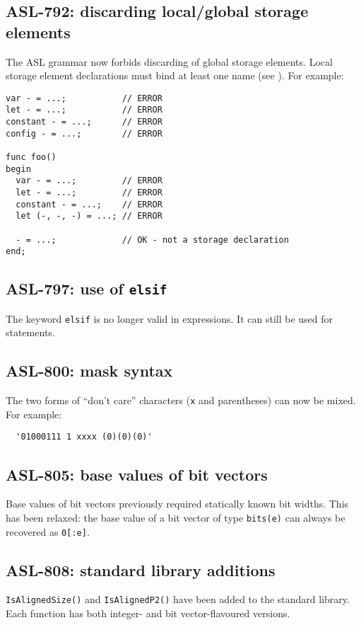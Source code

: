 \subsection{ASL-792: discarding local/global storage elements}
The ASL grammar now forbids discarding of global storage elements.
Local storage element declarations must bind at least one name (see ).
For example:
\begin{lstlisting}
var - = ...;           // ERROR
let - = ...;           // ERROR
constant - = ...;      // ERROR
config - = ...;        // ERROR

func foo()
begin
  var - = ...;         // ERROR
  let - = ...;         // ERROR
  constant - = ...;    // ERROR
  let (-, -, -) = ...; // ERROR

  - = ...;             // OK - not a storage declaration
end;
\end{lstlisting}

\subsection{ASL-797: use of \texttt{elsif}}
The keyword \texttt{elsif} is no longer valid in expressions.
It can still be used for statements.

\subsection{ASL-800: mask syntax}
The two forms of ``don't care'' characters (\texttt{x} and parentheses) can now be mixed.
For example:
\begin{lstlisting}
  '01000111 1 xxxx (0)(0)(0)'
\end{lstlisting}

\subsection{ASL-805: base values of bit vectors}
Base values of bit vectors previously required statically known bit widths.
This has been relaxed: the base value of a bit vector of type \texttt{bits(e)} can always be recovered as \texttt{0[:e]}.

\subsection{ASL-808: standard library additions}
\texttt{IsAlignedSize()} and \texttt{IsAlignedP2()} have been added to the standard library.
Each function has both integer- and bit vector-flavoured versions.

